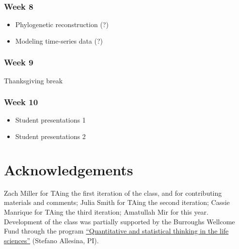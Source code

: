 \documentclass[
  letterpaper,
  DIV=11,
  numbers=noendperiod]{scrreprt}
\providecommand{\tightlist}{%
  \setlength{\itemsep}{0pt}\setlength{\parskip}{0pt}}\usepackage{longtable,booktabs,array}
\begin{document}
\hypertarget{week-8}{%
\subsubsection*{Week 8}\label{week-8}}

\begin{itemize}
\tightlist
\item
  Phylogenetic reconstruction (?)
\item
  Modeling time-series data (?)
\end{itemize}

\hypertarget{week-9}{%
\subsubsection*{Week 9}\label{week-9}}

Thanksgiving break

\hypertarget{week-10}{%
\subsubsection*{Week 10}\label{week-10}}

\begin{itemize}
\tightlist
\item
  Student presentations 1
\item
  Student presentations 2
\end{itemize}

\hypertarget{acknowledgements}{%
\section*{Acknowledgements}\label{acknowledgements}}


Zach Miller for TAing the first iteration of the class, and for
contributing materials and comments; Julia Smith for TAing the second
iteration; Cassie Manrique for TAing the third iteration; Amatullah Mir
for this year. Development of the class was partially supported by the
Burroughs Wellcome Fund through the program
\href{https://www.bwfund.org/grant-programs/institutional-programs/quantitative-and-statistical-thinking-life-sciences/grant}{``Quantitative
and statistical thinking in the life sciences''} (Stefano Allesina, PI).

\end{document}
